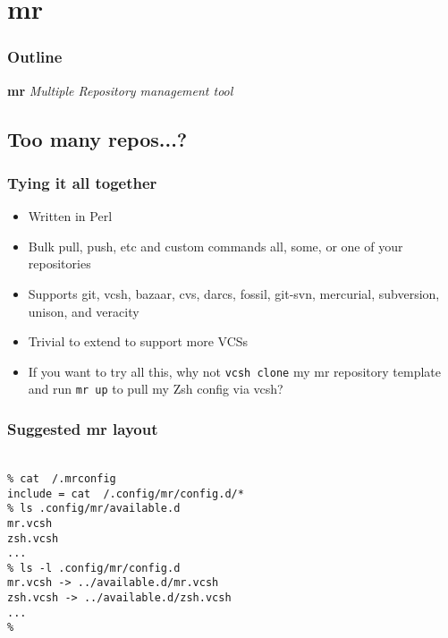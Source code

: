 \documentclass[t]{beamer}
\begin{document}
\section{mr}

\begin{frame}
	\frametitle{Outline}
	\tableofcontents[currentsection]
\end{frame}

\begin{frame}
		\begin{center}
			\vfill
			\vfill
			\textbf{mr}
			\vfill
			\textit{Multiple Repository management tool}
			\vfill
			\vfill
		\end{center}
\end{frame}

\subsection{Too many repos...?}

\begin{frame}
	\frametitle{Tying it all together}
	\begin{itemize}
		\item Written in Perl
		\item Bulk pull, push, etc and custom commands all, some, or one of your repositories
		\item Supports git, vcsh, bazaar, cvs, darcs, fossil, git-svn, mercurial, subversion, unison, and veracity
		\item Trivial to extend to support more VCSs
		\item If you want to try all this, why not \texttt{vcsh clone} my mr repository template and run \texttt{mr up} to pull my Zsh config via vcsh?
	\end{itemize}
\end{frame}

\begin{frame}
	\frametitle{Suggested mr layout}
	\texttt{ \\
		\% cat ~/.mrconfig \\
		include = cat ~/.config/mr/config.d/* \\
		\% ls .config/mr/available.d \\
		mr.vcsh \\
		zsh.vcsh \\
		... \\
		\% ls -l .config/mr/config.d \\
		mr.vcsh -> ../available.d/mr.vcsh \\
		zsh.vcsh -> ../available.d/zsh.vcsh \\
		... \\
		\%
	}
\end{frame}
\end{document}
